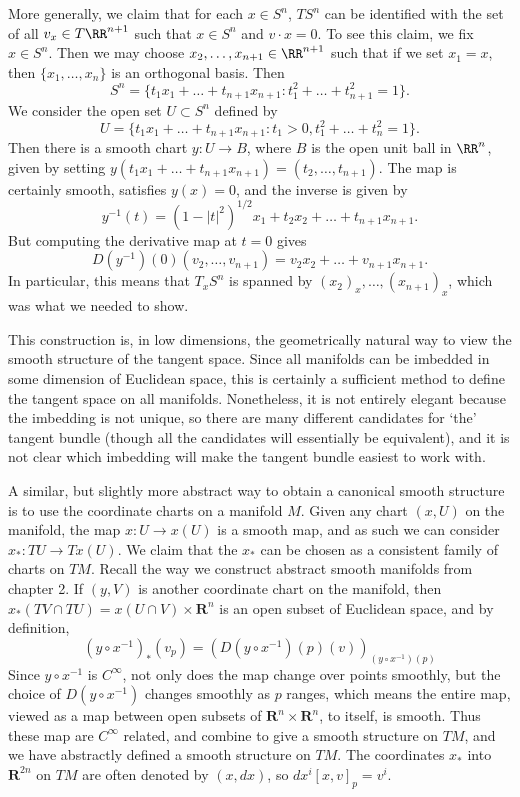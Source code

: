 \begin{example}
    More generally, we claim that for each $x \in S^n$, $TS^n$ can be identified with the set of all $v_x \in T\RR^{n+1}$ such that $x \in S^n$ and $v \cdot x = 0$. To see this claim, we fix $x \in S^n$. Then we may choose $x_2, \dots, x_{n+1} \in \RR^{n+1}$ such that if we set $x_1 = x$, then $\{ x_1, \dots, x_n \}$ is an orthogonal basis. Then
    \[ S^n = \{ t_1x_1 + \dots + t_{n+1}x_{n+1} : t_1^2 + \dots + t_{n+1}^2 = 1 \}. \]
    We consider the open set $U \subset S^n$ defined by
    \[ U = \{ t_1x_1 + \dots + t_{n+1}x_{n+1} : t_1 > 0, t_1^2 + \dots + t_n^2 = 1 \}. \]
    Then there is a smooth chart $y: U \to B$, where $B$ is the open unit ball in $\RR^n$, given by setting $y(t_1x_1 + \dots + t_{n+1}x_{n+1}) = (t_2, \dots, t_{n+1})$. The map is certainly smooth, satisfies $y(x) = 0$, and the inverse is given by
    \[ y^{-1}(t) = (1 - |t|^2)^{1/2} x_1 + t_2x_2 + \dots + t_{n+1}x_{n+1}. \]
    But computing the derivative map at $t = 0$ gives
    \[ D(y^{-1})(0)(v_2, \dots, v_{n+1}) = v_2x_2 + \dots + v_{n+1} x_{n+1}. \]
    In particular, this means that $T_xS^n$ is spanned by $(x_2)_x, \dots, (x_{n+1})_x$, which was what we needed to show.
\end{example}

This construction is, in low dimensions, the geometrically natural way to view the smooth structure of the tangent space. Since all manifolds can be imbedded in some dimension of Euclidean space, this is certainly a sufficient method to define the tangent space on all manifolds. Nonetheless, it is not entirely elegant because the imbedding is not unique, so there are many different candidates for `the' tangent bundle (though all the candidates will essentially be equivalent), and it is not clear which imbedding will make the tangent bundle easiest to work with.

A similar, but slightly more abstract way to obtain a canonical smooth structure is to use the coordinate charts on a manifold $M$. Given any chart $(x,U)$ on the manifold, the map $x: U \to x(U)$ is a smooth map, and as such we can consider $x_*: TU \to Tx(U)$. We claim that the $x_*$ can be chosen as a consistent family of charts on $TM$. Recall the way we construct abstract smooth manifolds from chapter 2. If $(y,V)$ is another coordinate chart on the manifold, then $x_*(TV \cap TU) = x(U \cap V) \times \mathbf{R}^n$ is an open subset of Euclidean space, and by definition,
%
\[ (y \circ x^{-1})_*(v_p) = (D(y \circ x^{-1})(p)(v))_{(y \circ x^{-1})(p)} \]
%
Since $y \circ x^{-1}$ is $C^\infty$, not only does the map change over points smoothly, but the choice of $D(y \circ x^{-1})$ changes smoothly as $p$ ranges, which means the entire map, viewed as a map between open subsets of $\mathbf{R}^n \times \mathbf{R}^n$, to itself, is smooth. Thus these map are $C^\infty$ related, and combine to give a smooth structure on $TM$, and we have abstractly defined a smooth structure on $TM$. The coordinates $x_*$ into $\mathbf{R}^{2n}$ on $TM$ are often denoted by $(x,dx)$, so $dx^i[x,v]_p = v^i$.

